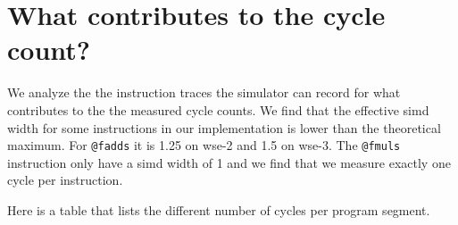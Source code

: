 \section{What contributes to the cycle count?}
We analyze the the instruction traces the simulator can record for what contributes to the the measured cycle counts.
We find that the effective simd width for some instructions in our implementation is lower than the theoretical maximum.
For \texttt{@fadds} it is 1.25 on wse-2 and 1.5 on wse-3.
The \texttt{@fmuls} instruction only have a simd width of 1 and we find that we measure exactly one cycle per instruction.

Here is a table that lists the different number of cycles per program segment. 